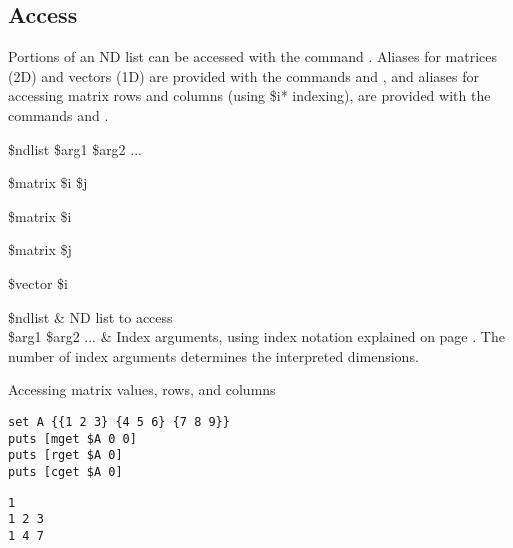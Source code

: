 \documentclass{article}
\begin{document}
\subsection{Access}
Portions of an ND list can be accessed with the command .
Aliases for matrices (2D) and vectors (1D) are provided with the commands  and , and aliases for accessing matrix rows and columns (using \$i* indexing), are provided with the commands  and .
\begin{syntax}
 \$ndlist \$arg1 \$arg2 ...
\end{syntax}
\begin{syntax}
 \$matrix \$i \$j
\end{syntax}
\begin{syntax}
 \$matrix \$i
\end{syntax}
\begin{syntax}
 \$matrix \$j
\end{syntax}
\begin{syntax}
 \$vector \$i
\end{syntax}
\begin{args}
\$ndlist & ND list to access \\
\$arg1 \$arg2 ... & Index arguments, using index notation explained on page \pageref{indexformat}. The number of index arguments determines the interpreted dimensions.
\end{args}

\begin{example}{Accessing matrix values, rows, and columns}
\begin{lstlisting}
set A {{1 2 3} {4 5 6} {7 8 9}}
puts [mget $A 0 0]
puts [rget $A 0]
puts [cget $A 0]
\end{lstlisting}
\tcblower
\begin{lstlisting}
1
1 2 3
1 4 7
\end{lstlisting}
\end{example}

\clearpage
\end{document}
